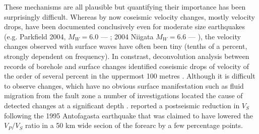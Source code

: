 \documentclass[11pt]{article}
\begin{document}
These mechanisms are all plausible but quantifying their importance has been surprisingly difficult. Whereas by now coseismic velocity changes, mostly velocity drops, have been documented conclusively even for moderate size earthquakes (e.g. Parkfield 2004, $M_W=6.0$ --- \citealp{brenguier_etal_Science_08}; 2004 Niigata $M_W=6.6$ --- \citealp{wegler09}), the velocity changes observed with surface waves have often been tiny (tenths of a percent, strongly dependent on frequency). In constrast, deconvolution analysis between records of borehole and surface changes identified coseismic drops of velocity of the order of several percent in the uppermost 100 metres \citep{Sawazaki2009,Nakata2011,takagi_etal_JGR_12}. %
Although it is difficult to observe changes, which have no obvious surface manifestation such as fluid migration from the fault zone a number of investigations located the cause of detected changes at a significant depth \citep{froment_etal_GRL_13, rivet_etal_GRL_11, hobiger_etal_JGR_12}. \citet{husen01_geology} reported
a postseismic reduction in $V_S$ following the 1995 Antofagasta earthquake that was claimed to have lowered the $V_P/V_S$ ratio in a 50 km wide secion of the forearc by a few percentage points.%
\end{document}
